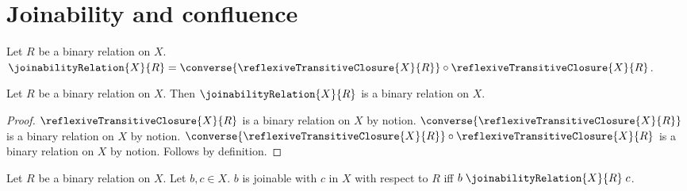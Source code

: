 

\section{Joinability and confluence}

\begin{definition}\label{joinability_relation}
    Let $R$ be a binary relation on $X$.
    $\joinabilityRelation{X}{R}=
        \converse{\reflexiveTransitiveClosure{X}{R}}
            \circ\reflexiveTransitiveClosure{X}{R}$.
\end{definition}

\begin{classification}\label{joinability_relation_type}
    Let $R$ be a binary relation on $X$.
    Then $\joinabilityRelation{X}{R}$ is a binary relation on $X$.
\end{classification}
\begin{proof}
    $\reflexiveTransitiveClosure{X}{R}$ is a binary relation on $X$
        by notion.
    $\converse{\reflexiveTransitiveClosure{X}{R}}$ is a binary relation on
        $X$ by notion.
    $\converse{\reflexiveTransitiveClosure{X}{R}}
        \circ\reflexiveTransitiveClosure{X}{R}$ is a binary relation on $X$
        by notion.
    Follows by definition.
\end{proof}

\begin{definition}\label{joinable_on}
    Let $R$ be a binary relation on $X$.
    Let $b,c\in X$.
    $b$ is joinable with $c$ in $X$ with respect to $R$ iff
        $b\mathrel{\joinabilityRelation{X}{R}}c$.
\end{definition}

